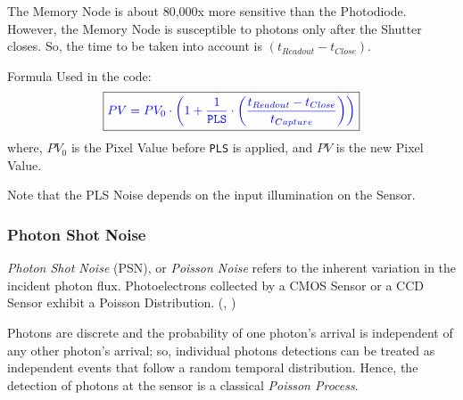 \documentclass[../../main.tex]{subfiles}
\begin{document}
The Memory Node is about 80,000x more sensitive than the Photodiode. However, the Memory Node is susceptible to photons only after the Shutter closes. So, the time to be taken into account is $(t_{Readout} - t_{Close})$. \newline

Formula Used in the code:
\begin{equation}
    \begin{aligned}
        \boxed{ \color{blue} PV =  PV_0 \cdot \left( 1 + \frac{1}{\texttt{PLS}} \cdot \left(\frac{t_{Readout} - t_{Close}}{t_{Capture}}\right) \right) \color{black}} 
    \end{aligned}
\end{equation}
where, $PV_0$ is the Pixel Value before \texttt{PLS} is applied, and $PV$ is the new Pixel Value. 

Note that the PLS Noise depends on the input illumination on the Sensor.




\newpage
\subsubsection{Photon Shot Noise} %
\emph{Photon Shot Noise} (PSN), or \emph{Poisson Noise} refers to the inherent variation in the incident photon flux. Photoelectrons collected by a CMOS Sensor or a CCD Sensor exhibit a Poisson Distribution. (\cite{DSLRs}, \cite{Hasinoff2014})

Photons are discrete and the probability of one photon's arrival is independent of any other photon's arrival; so, individual photons detections can be treated as independent events that follow a random temporal distribution. Hence, the detection of photons at the sensor is a classical  \emph{Poisson Process}. 
\end{document}
